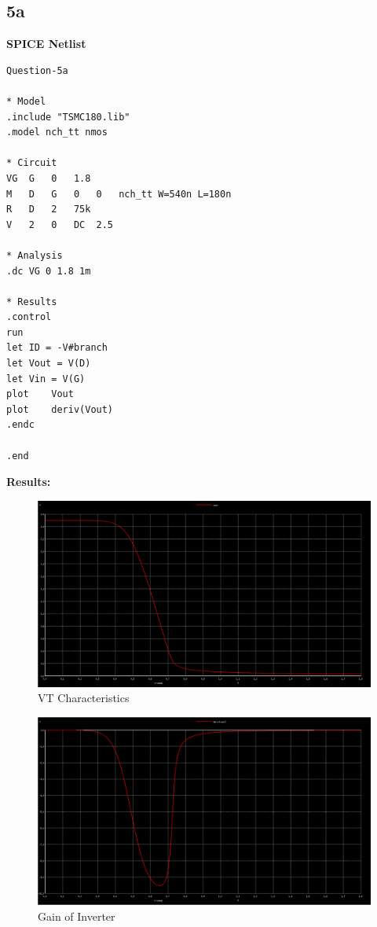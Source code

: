 \documentclass{article}
\begin{document}
\subsection{5a}
\textbf{SPICE Netlist}
\begin{lstlisting}
Question-5a

* Model
.include "TSMC180.lib"
.model nch_tt nmos

* Circuit
VG	G	0	1.8
M	D	G	0	0	nch_tt W=540n L=180n
R	D	2	75k
V	2	0	DC	2.5

* Analysis
.dc VG 0 1.8 1m

* Results
.control
run 
let ID = -V#branch
let Vout = V(D)
let Vin = V(G)
plot	Vout
plot	deriv(Vout)
.endc

.end
\end{lstlisting}
\pagebreak
\textbf{Results:}\\
\begin{figure}[!ht]
    \centering
    \includegraphics[scale=0.3]{Images/5avtc.png}
    \caption{VT Characteristics}
\end{figure}
\begin{figure}[!ht]
    \centering
    \includegraphics[scale=0.3]{Images/5ar.png}
    \caption{Gain of Inverter}
\end{figure}
\end{document}
